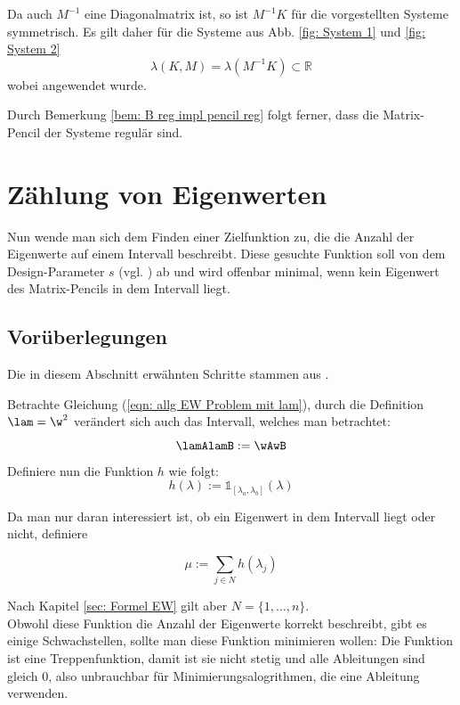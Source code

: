\documentclass[a4paper,12pt]{report}
\newcommand{\R}{\mathbb R}
\newcommand{\inv}{^{-1}}
\newcommand{\1}{\mathds{1}}
\theoremstyle{plain} %
\theoremstyle{definition} %
\theoremstyle{remark}
\begin{document}
            Da auch $M\inv$ eine Diagonalmatrix ist, so ist $M\inv K$ für die vorgestellten Systeme symmetrisch.
            Es gilt daher für die Systeme aus Abb. \ref{fig: System 1} und \ref{fig: System 2}
            \begin{equation}
                  \label{eqn: alle Ew reell}
                  \lambda(K, M) = \lambda(M\inv K) \subset \R
            \end{equation}
            wobei \cite[S. 393]{matrixGolub} angewendet wurde.

            Durch Bemerkung \ref{bem: B reg impl pencil reg} folgt ferner, dass die Matrix-Pencil der Systeme regulär sind.

\chapter{Zählung von Eigenwerten}
\label{sec: EW Zählung}
      Nun wende man sich dem Finden einer Zielfunktion zu, die die Anzahl der Eigenwerte auf einem Intervall beschreibt.
      Diese gesuchte Funktion soll von dem Design-Parameter $s$ (vgl. \cite[S. 2]{hauptteilTkachuk}) ab und wird offenbar minimal,
      wenn kein Eigenwert des Matrix-Pencils in dem Intervall liegt.

      \section{Vorüberlegungen}
            Die in diesem Abschnitt erwähnten Schritte stammen aus \cite[S. 2-4]{hauptteilTkachuk}.

            Betrachte Gleichung (\ref{eqn: allg EW Problem mit lam}), durch die Definition $\lam = \w^2$ verändert sich auch das Intervall, welches man betrachtet:
            $$\lamAlamB:=\wAwB$$
            Definiere nun die Funktion $h$ wie folgt:
            $$h(\lambda):=\1_{[\lambda_a,\lambda_b]}(\lambda)$$

            Da man nur daran interessiert ist, ob ein Eigenwert in dem Intervall liegt oder nicht, definiere

            $$\mu := \sum_{j\in N} h(\lambda_j)$$

            Nach Kapitel \ref{sec: Formel EW} gilt aber $N=\{1,\dots,n\}$.\\
            Obwohl diese Funktion die Anzahl der Eigenwerte korrekt beschreibt, gibt es einige Schwachstellen, sollte man diese Funktion minimieren wollen:
            Die Funktion ist eine Treppenfunktion, damit ist sie nicht stetig und alle Ableitungen sind gleich 0, also unbrauchbar für Minimierungsalogrithmen, die eine Ableitung verwenden.
\end{document}
